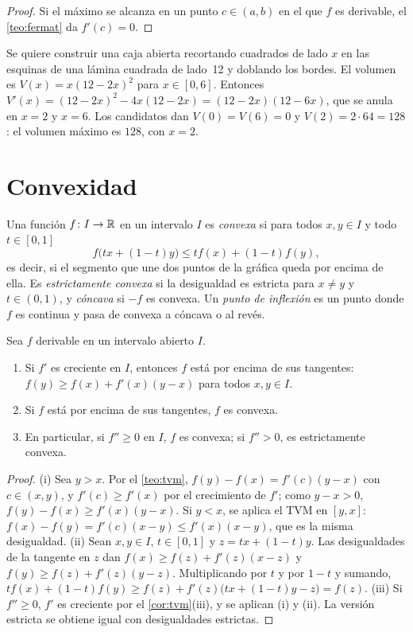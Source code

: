 \begin{proof}
Si el máximo se alcanza en un punto $c\in(a,b)$ en el que $f$ es derivable, el \cref{teo:fermat} da $f'(c)=0$.
\end{proof}

\begin{ejemplo}\label{ej:optimizacion}
Se quiere construir una caja abierta recortando cuadrados de lado $x$ en las esquinas de una lámina cuadrada de lado~12 y doblando los bordes. El volumen es $V(x)=x(12-2x)^{2}$ para $x\in[0,6]$. Entonces $V'(x)=(12-2x)^{2}-4x(12-2x)=(12-2x)(12-6x)$, que se anula en $x=2$ y $x=6$. Los candidatos dan $V(0)=V(6)=0$ y $V(2)=2\cdot64=128$: el volumen máximo es $128$, con $x=2$.
\end{ejemplo}

\section{Convexidad}

\begin{definicion}\label{def:convexa}
Una función $f\colon I\to\mathbb{R}$ en un intervalo $I$ es \emph{convexa} si para todos $x,y\in I$ y todo $t\in[0,1]$
\[
f\bigl(tx+(1-t)y\bigr)\le tf(x)+(1-t)f(y),
\]
es decir, si el segmento que une dos puntos de la gráfica queda por encima de ella. Es \emph{estrictamente convexa} si la desigualdad es estricta para $x\ne y$ y $t\in(0,1)$, y \emph{cóncava} si $-f$ es convexa. Un \emph{punto de inflexión} es un punto donde $f$ es continua y pasa de convexa a cóncava o al revés.
\end{definicion}

\begin{teorema}\label{teo:convexidad}
Sea $f$ derivable en un intervalo abierto $I$.
\begin{enumerate}
  \item Si $f'$ es creciente en $I$, entonces $f$ está por encima de sus tangentes: $f(y)\ge f(x)+f'(x)(y-x)$ para todos $x,y\in I$.
  \item Si $f$ está por encima de sus tangentes, $f$ es convexa.
  \item En particular, si $f''\ge0$ en $I$, $f$ es convexa; si $f''>0$, es estrictamente convexa.
\end{enumerate}
\end{teorema}

\begin{proof}
(i) Sea $y>x$. Por el \cref{teo:tvm}, $f(y)-f(x)=f'(c)(y-x)$ con $c\in(x,y)$, y $f'(c)\ge f'(x)$ por el crecimiento de $f'$; como $y-x>0$, $f(y)-f(x)\ge f'(x)(y-x)$. Si $y<x$, se aplica el TVM en $[y,x]$: $f(x)-f(y)=f'(c)(x-y)\le f'(x)(x-y)$, que es la misma desigualdad.
(ii) Sean $x,y\in I$, $t\in[0,1]$ y $z=tx+(1-t)y$. Las desigualdades de la tangente en $z$ dan $f(x)\ge f(z)+f'(z)(x-z)$ y $f(y)\ge f(z)+f'(z)(y-z)$. Multiplicando por $t$ y por $1-t$ y sumando, $tf(x)+(1-t)f(y)\ge f(z)+f'(z)\bigl(tx+(1-t)y-z\bigr)=f(z)$.
(iii) Si $f''\ge0$, $f'$ es creciente por el \cref{cor:tvm}(iii), y se aplican (i) y (ii). La versión estricta se obtiene igual con desigualdades estrictas.
\end{proof}

